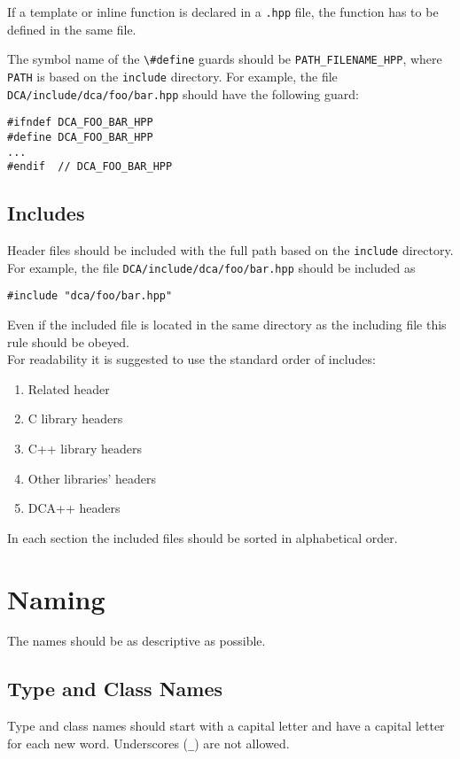 \documentclass[a4paper]{article}
\newcommand{\inlinecode}[1]{\lstinline|#1|}
\begin{document}
If a template or inline function is declared in a \verb|.hpp| file, the function has to be defined in the same file.

The symbol name of the \inlinecode{\#define} guards should be \inlinecode{PATH_FILENAME_HPP}, where \inlinecode{PATH} is based on the \verb|include| directory.
For example, the file\\ \verb|DCA/include/dca/foo/bar.hpp| should have the following guard:

\begin{lstlisting}
#ifndef DCA_FOO_BAR_HPP
#define DCA_FOO_BAR_HPP
...
#endif  // DCA_FOO_BAR_HPP
\end{lstlisting}

\subsection{Includes}
Header files should be included with the full path based on the \verb|include| directory.
For example, the file \verb|DCA/include/dca/foo/bar.hpp| should be included as
\begin{lstlisting}
#include "dca/foo/bar.hpp"
\end{lstlisting}
Even if the included file is located in the same directory as the including file this rule should be obeyed. \\

For readability it is suggested to use the standard order of includes:
\begin{enumerate}
	\item Related header
	\item C library headers
	\item C++ library headers
	\item Other libraries' headers
	\item DCA++ headers
\end{enumerate}
In each section the included files should be sorted in alphabetical order.
\section{Naming}

The names should be as descriptive as possible.

\subsection{Type and Class Names}

Type and class names should start with a capital letter and have a capital letter for each new word.
Underscores (\inlinecode{_}) are not allowed.
\end{document}
